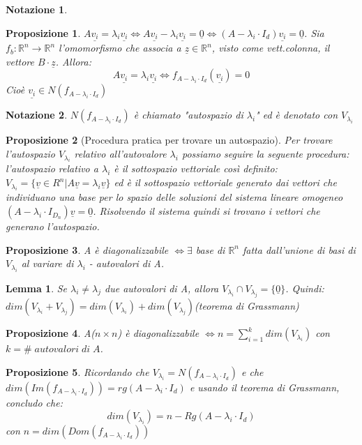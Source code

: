 \documentclass[12pt]{article}
\newenvironment{para}{\begin{adjustwidth}{13mm}{}}{\end{adjustwidth}}
\newtheorem{Lemma}{Lemma}[subsection]
\newtheorem{Proposizione}{Proposizione}[subsection]
\newtheorem{Notazione}{Notazione}[subsection]
\begin{document}
\begin{para}
\begin{Notazione}
\end{Notazione}
\begin{Proposizione}
    $A\underline{v_i} = \lambda_i \underline{v_i} \Leftrightarrow A\underline{v_i} - \lambda_i \underline{v_i} = \underline{0} \Leftrightarrow (A-\lambda_i \cdot I_d)\underline{v_i} = \underline{0}$. Sia $f_b: \mathbb{R}^n \rightarrow \mathbb{R}^n$ l'omomorfismo che associa a $\underline{z} \in \mathbb{R}^n$, visto come vett.colonna, il vettore $B \cdot \underline{z}$. Allora: $$A\underline{v_i}=\lambda_i \underline{v_i} \Leftrightarrow f_{A-\lambda_i \cdot I_d}(\underline{v_i}) = 0$$ Cioè $\underline{v_i} \in N(f_{A-\lambda_i \cdot I_d})$
\end{Proposizione}
\begin{Notazione}
    $N(f_{A-\lambda_i \cdot I_d})$ è chiamato "autospazio di $\lambda_i$" ed è denotato con $V_{\lambda_i}$
\end{Notazione}
\begin{Proposizione}[Procedura pratica per trovare un autospazio]
Per trovare l'autospazio $V_{\lambda_{i}}$ relativo all'autovalore $\lambda_i$ possiamo seguire la seguente procedura: l'autospazio relativo a $\lambda_i$ è il sottospazio vettoriale così definito: $V_{\lambda_{i}} = \{\underline{v}\in R^{n} | A\underline{v} = \lambda_i \underline{v}\}$ ed è il sottospazio vettoriale generato dai vettori che individuano una base per lo spazio delle soluzioni del sistema lineare omogeneo $(A-\lambda_i\cdot I_{D_n})\underline{v} = \underline{0}$. Risolvendo il sistema quindi si trovano i vettori che generano l'autospazio.
\end{Proposizione}
\begin{Proposizione}
    A è diagonalizzabile $\Leftrightarrow \exists$ base di $\mathbb{R}^n$ fatta dall'unione di basi di $V_{\lambda_i}$ al variare di $\lambda_i$ - autovalori di A.
\end{Proposizione}
\begin{Lemma}
    Se $\lambda_i \neq \lambda_j$ due autovalori di A, allora $V_{\lambda_i} \cap V_{\lambda_j} = \{\underline{0}\}$. Quindi: $dim(V_{\lambda_i} + V_{\lambda_j}) = dim(V_{\lambda_i}) + dim(V_{\lambda_j})$(teorema di Grassmann)
\end{Lemma}
\begin{Proposizione}
    A($n \times n$) è diagonalizzabile $\Leftrightarrow n = \sum_{i=1}^k dim(V_{\lambda_i})$ con $k = \# \; autovalori \; di \; A$.
\end{Proposizione}
\begin{Proposizione}
    Ricordando che $V_{\lambda_i} = N(f_{A-\lambda_i \cdot I_d})$ e che $dim(Im(f_{A-\lambda_i \cdot I_d})) = rg(A-\lambda_i \cdot I_d)$ e usando il teorema di Grassmann, concludo che: $$dim(V_{\lambda_i}) = n-Rg(A-\lambda_i \cdot I_d)$$ con $n = dim(Dom(f_{A-\lambda_i \cdot I_d}))$

\end{Proposizione}
\end{para}
\end{document}
